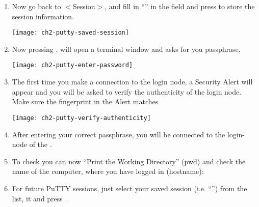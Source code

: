 \begin{enumerate}
    \item  Now go back to $<$Session$>$, and fill in ``\emph{\hpcname}'' in the
       field and press  to
      store the session information.

      \begin{center}
      \texttt{[image: ch2-putty-saved-session]}
      \end{center}

    \item  Now pressing , will open a terminal window and
      asks for you passphrase.

      \begin{center}
      \texttt{[image: ch2-putty-enter-password]}
      \end{center}

    \item  The first time you make a connection to the login node, a Security
      Alert will appear and you will be asked to verify the authenticity of the
      login node.
      \ifgent
      Make sure the fingerprint in the Alert matches \strong{\loginfingerprint}
      \fi

      \begin{center}
      \texttt{[image: ch2-putty-verify-authenticity]}
      \end{center}

    \item  After entering your correct passphrase, you will be connected to the
      login-node of the \hpc.
    \item  To check you can now ``Print the Working Directory'' (pwd) and check
      the name of the computer, where you have logged in (hostname):

  \begin{prompt}
  \end{prompt}

    \item  For future PuTTY sessions, just select your saved session (i.e.
      ``\emph{\hpcname}'') from the list,  it and press
      .
  \end{enumerate}

\fi

\ifmacORlinux

